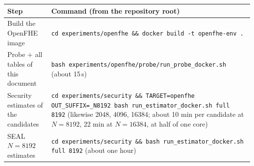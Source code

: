 \documentclass[11pt]{article}
\begin{document}
{\footnotesize
\begin{tabular}{@{}L{5.3cm}L{11.2cm}@{}}
\toprule
Step & Command (from the repository root) \\
\midrule
Build the OpenFHE image & \texttt{cd experiments/openfhe \&\& docker build -t openfhe-env .} \\
Probe + all tables of this document & \texttt{bash experiments/openfhe/probe/run\_probe\_docker.sh} (about 15\,s) \\
Security estimates of the candidates & \texttt{cd experiments/security \&\& TARGET=openfhe OUT\_SUFFIX=\_N8192 bash run\_estimator\_docker.sh full 8192} (likewise 2048, 4096, 16384; about 10 min per candidate at $N{=}8192$, 22 min at $N{=}16384$, at half of one core) \\
SEAL $N{=}8192$ estimates & \texttt{cd experiments/security \&\& bash run\_estimator\_docker.sh full 8192} (about one hour) \\
\bottomrule
\end{tabular}}
\end{document}
